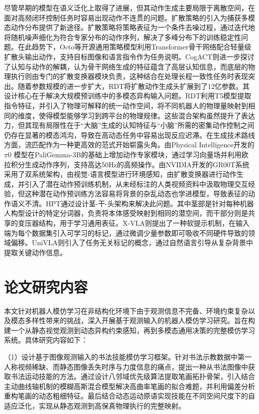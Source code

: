 尽管早期的模型在语义泛化上取得了进展，但其动作生成主要局限于离散空间，在面对高频闭环控制任务时容易出现动作不连贯的问题。扩散策略的引入为捕获多模态动作分布提供了新途径。扩散策略将策略表征为一个条件去噪过程，通过迭代地将随机噪声细化为符合专家分布的动作序列，解决了多峰分布下的训练稳定性问题。在此趋势下，Octo\cite{team2024octo}等开源通用策略模型利用Transformer骨干网络配合轻量级扩散头输出动作，支持目标图像和语言指令作为任务说明。CogACT\cite{li2024cogact}则进一步探讨了认知与动作的解耦，认为骨干网络生成的特征蕴含了高层认知信息，而底层的物理执行则由专门的扩散变换器模块负责，这种结合在处理长程一致性任务时表现突出。随着参数规模的进一步扩大，RDT\cite{liu2024rdt}将扩散动作生成头扩展到了12亿参数。其设计核心在于解决大规模预训练中的多模态异构输入问题。RDT利用T5模型\cite{colin2020exploring}提取指令特征，并引入了物理可解释的统一动作空间，将不同机器人的物理量映射到相同的维度，使得模型能够学习到跨平台的物理规律。这些混合架构虽然提升了表达力，但其现有局限性在于“大脑”生成的认知特征与“小脑”所需的密集动作控制之间仍存在显著的模态鸿沟，导致在高动态任务中容易出现反应迟滞。在生成技术路线方面，流匹配作为一种更高效的范式开始崭露头角。由Physical Intelligence开发的$\pi0$ \cite{black2024pi}模型在PaliGemma-3B\cite{beyer2024paligemma}的基础上增加动作专家模块，通过学习向量场并利用欧拉积分生成动作序列，支持高达50Hz的高频操作。由NVIDIA开发的GR00T\cite{bjorck2025gr00t}系统采用了双系统架构，由视觉-语言模型进行环境感知，由扩散变换器进行动作生成，并引入了潜在动作预训练机制\cite{schmidt2023learning,ye2024latent,zheng2025flare}，从未经标注的人类视频资料中汲取物理交互经验，但这种潜在动作预训练方法容易将背景的杂乱动态也学进模型，导致表征的动作语义不清。HPT\cite{wang2024scaling}通过设计茎-干-头架构来解决此问题。其中茎部是针对每种机器人构型设计的特定分词器，负责将本体感受映射到相同的潜空间，而干部分则是共享的变压器结构，用于学习通用表征。X-VLA\cite{zheng2025x}则提出了一种软提示机制，在输入端为每个数据集引入可学习的标记，通过微调少量参数即可吸收不同硬件导致的领域偏移。UniVLA\cite{bu2025univla}则引入了任务无关标记的概念，通过自然语言引导从复杂背景中提取关键动作信息。

\section{论文研究内容}
本文针对机器人模仿学习在非结构化环境下由于观测信息不完备、环境约束复杂以及模态多样性带来的挑战，深入开展基于观测输入的机器人模仿学习研究。旨在构建一个从静态视觉观测到动态异构约束感知，再到多模态通用决策的完整模仿学习系统。具体研究内容如下：

（1）设计基于图像观测输入的书法技能模仿学习框架。针对书法示教数据中第一人称视频稀缺、而静态图像丢失时序与力度信息的痛点，提出一种从书法图像中获取书法运动技能的方法。通过设计八邻域优先级算法提取笔画拓扑骨架，引入结合主动曲线轴机制的模糊高斯混合模型解决高曲率笔画的拟合难题，并利用偏差分析重构笔画的动态粗细特征。最后结合动态运动原语实现技能在不同空间尺度下的自适应泛化，实现从静态观测到高保真物理执行的完整映射。

